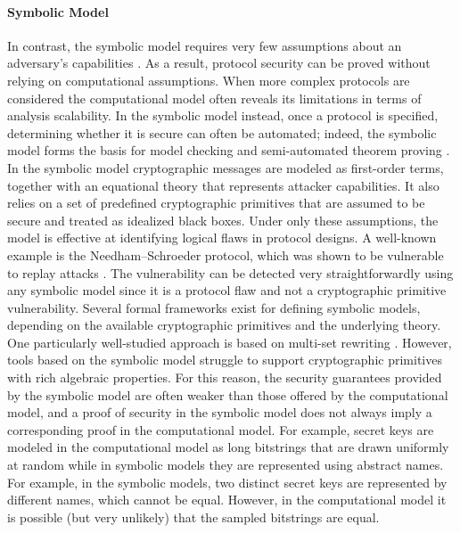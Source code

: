 \paragraph{Symbolic Model}
In contrast, the symbolic model requires very few assumptions about an adversary’s capabilities \cite{on-the-security-of-pk-protocols}. As a result, protocol security can be proved without relying on computational assumptions. When more complex protocols are considered the computational model often reveals its limitations in terms of analysis scalability. In the symbolic model instead, once a protocol is specified, determining whether it is secure can often be automated; indeed, the symbolic model forms the basis for model checking and semi-automated theorem proving \cite{Blanchet_2022, tamarin}. In the symbolic model cryptographic messages are modeled as first-order terms,
together with an equational theory that represents attacker capabilities. It also relies on a set of predefined cryptographic primitives that are assumed to be secure and treated as idealized black boxes. Under only these assumptions, the model is effective at identifying logical flaws in protocol designs. A well-known example is the Needham–Schroeder protocol, which was shown to be vulnerable to replay attacks \cite{timestamps-in-key-distribution-protocols}. The vulnerability can be detected very straightforwardly using any symbolic model since it is a protocol flaw and not a cryptographic primitive vulnerability. Several formal frameworks exist for defining symbolic models, depending on the available cryptographic primitives and the underlying theory. One particularly well-studied approach is based on multi-set rewriting \cite{multiset-rewriting-and-the-complexity-of-bounded-security-protocols, rewriting-for-cryptographic-protocol-verification}. However, tools based on the symbolic model struggle to support cryptographic primitives with rich algebraic properties. For this reason, the security guarantees provided by the symbolic model are often weaker than those offered by the computational model, and a proof of security in the symbolic model does not always imply a corresponding proof in the computational model. For example, secret keys are modeled in the computational model as long bitstrings that are drawn uniformly at random while in symbolic models they are represented using abstract names. For example, in the symbolic models, two distinct secret keys are represented by different names, which cannot be equal. However, in the computational model it is possible (but very unlikely) that the sampled bitstrings are equal. 

